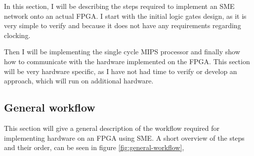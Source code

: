 In this section, I will be describing the steps required to implement an SME
network onto an actual FPGA. I start with the initial logic gates design, as it
is very simple to verify and because it does not have any requirements
regarding clocking.

Then I will be implementing the single cycle MIPS processor and finally show
how to communicate with the hardware implemented on the FPGA. This section will
be very hardware specific, as I have not had time to verify or develop an
approach, which will run on additional hardware.

\subsection{General workflow}
This section will give a general description of the workflow required for
implementing hardware on an FPGA using SME. A short overview of the steps and
their order, can be seen in figure \ref{fig:general-workflow},

